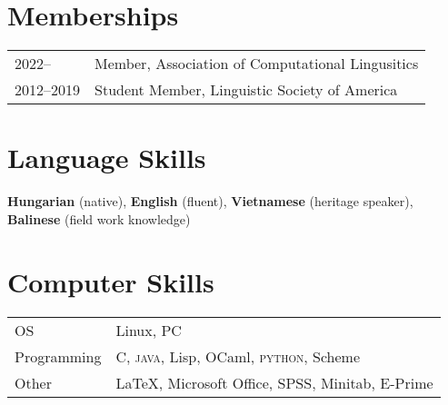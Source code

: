 \documentclass[11pt]{article} %
\begin{document}
\section*{Memberships}
\begin{longtable}{p{1in} p{5.3in}}
2022-- & Member, Association of Computational Lingusitics \\
2012--2019 & Student Member, Linguistic Society of America
\end{longtable}


\section*{Language Skills}

\textbf{Hungarian} (native), \textbf{English} (fluent), \textbf{Vietnamese} (heritage speaker), \textbf{Balinese} (field work knowledge)



\section*{Computer Skills}
\begin{tabular}{p{1in} p{5.3in}}
{OS} & {Linux, PC} \\
{Programming} & { C, \textsc{java}, Lisp, OCaml, \textsc{python}, Scheme} \\
{Other} & {\LaTeX, Microsoft Office, SPSS, Minitab, E-Prime} \\
\end{tabular}
\end{document}
